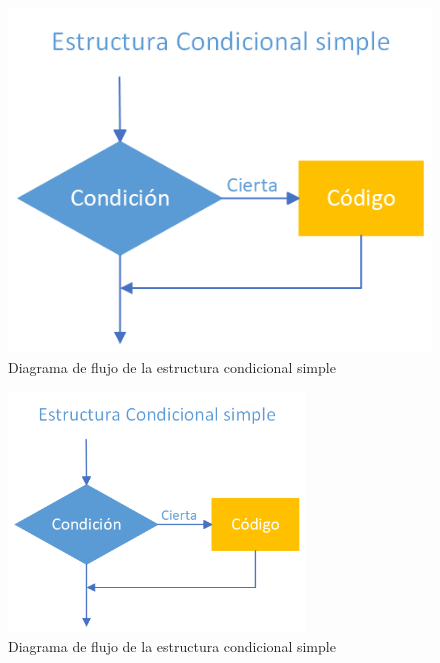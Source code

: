 \documentclass[
  a4paper,
]{scrreport}
\theoremstyle{definition}
\theoremstyle{definition}
\theoremstyle{remark}
\begin{document}
\begin{figure}

{\centering \includegraphics{./img/04-estructuras-control/condicional-simple.png}

}

\caption{Diagrama de flujo de la estructura condicional simple}

\end{figure}

\begin{figure}

{\centering \includegraphics[width=0.7\textwidth,height=\textheight]{./img/04-estructuras-control/condicional-simple.png}

}

\caption{Diagrama de flujo de la estructura condicional simple}

\end{figure}
\end{document}
